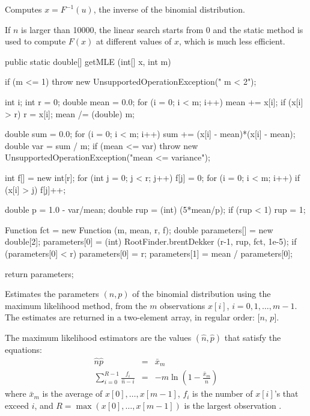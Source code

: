\begin{tabb} Computes $x = F^{-1}(u)$, the inverse of the binomial distribution.
\begin{detailed}%
   If $n$ is larger than 10000, the linear search starts from 0 and the
    static method is used to compute $F(x)$ at
   different values of $x$, which is much less efficient.
\end{detailed}%
\end{tabb}
\begin{code}

   public static double[] getMLE (int[] x, int m)\begin{hide} {
      if (m <= 1)
         throw new UnsupportedOperationException(" m < 2");

      int i;
      int r = 0;
      double mean = 0.0;
      for (i = 0; i < m; i++) {
         mean += x[i];
         if (x[i] > r)
            r = x[i];
      }
      mean /= (double) m;

      double sum = 0.0;
      for (i = 0; i < m; i++)
         sum += (x[i] - mean)*(x[i] - mean);
      double var = sum / m;
      if (mean <= var)
         throw new UnsupportedOperationException("mean <= variance");

      int f[] = new int[r];
      for (int j = 0; j < r; j++) {
         f[j] = 0;
         for (i = 0; i < m; i++)
            if (x[i] > j) f[j]++;
      }

      double p = 1.0 - var/mean;
      double rup = (int) (5*mean/p);
      if (rup < 1) rup = 1;

      Function fct = new Function (m, mean, r, f);
      double parameters[] = new double[2];
      parameters[0] = (int) RootFinder.brentDekker (r-1, rup, fct, 1e-5);
      if (parameters[0] < r)
         parameters[0] = r;
      parameters[1] = mean / parameters[0];

      return parameters;
   }\end{hide}
\end{code}
\begin{tabb}
   Estimates the parameters $(n,p)$ of the binomial distribution
   using the maximum likelihood method, from the $m$ observations
   $x[i]$, $i = 0, 1,\ldots, m-1$. The estimates are returned in a two-element
    array, in regular order: [$n$, $p$].
   \begin{detailed}
   The maximum likelihood estimators are the values $(\hat n, \hat p)$
   that satisfy the equations:
   \begin{eqnarray*}
      \hat{n}\hat{p} & = & \bar{x}_m\\
      \sum_{i=0}^{R-1} \frac{f_i}{\hat{n} - i} & = & - m \ln \left(1 - \frac{\bar{x}_m}{\hat{n}}\right)
   \end{eqnarray*}
   where $\bar x_m$ is the average of $x[0],\dots,x[m-1]$,
   $f_i$ is the number of $x[i]$'s that exceed $i$,
   and $R =\max(x[0],\ldots,x[m-1])$ is the largest observation
   \cite[page 57]{tJOH69a}.
   \end{detailed}
\end{tabb}
